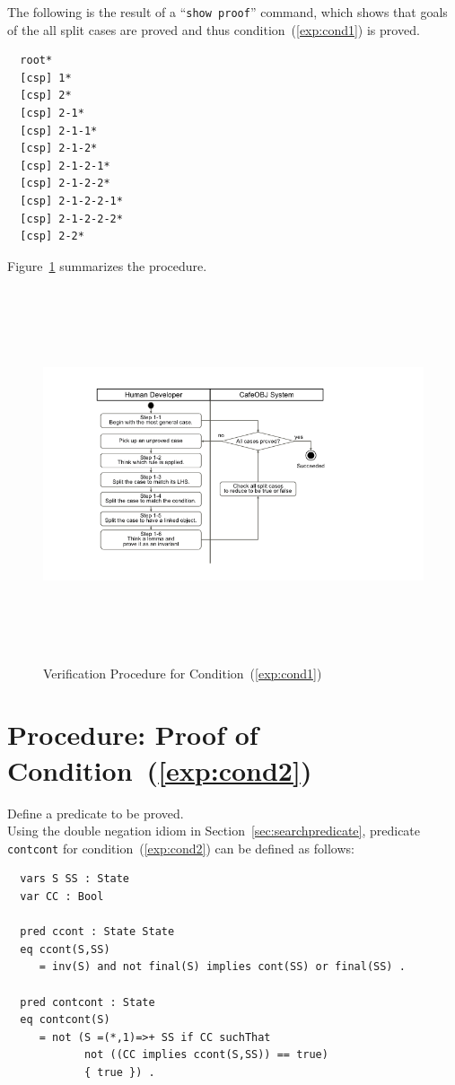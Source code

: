 \documentclass[12pt]{report}
\newcommand{\stt}[1]{{\small{\tt {#1}}}}
\begin{document}
The following is the result of a ``\stt{show proof}'' command, which shows
that goals of the all split cases are proved and thus
condition~(\ref{exp:cond1}) is proved.
\small
\begin{verbatim}
  root*
  [csp] 1*
  [csp] 2*
  [csp] 2-1*
  [csp] 2-1-1*
  [csp] 2-1-2*
  [csp] 2-1-2-1*
  [csp] 2-1-2-2*
  [csp] 2-1-2-2-1*
  [csp] 2-1-2-2-2*
  [csp] 2-2*
\end{verbatim}
\normalsize

Figure~\ref{fig:procedure1} summarizes the procedure.
\begin{figure}
\centering
\includegraphics[height=11cm,natwidth=720,natheight=405,clip,trim=100 55 190 40]{procedure1.png}
\caption{Verification Procedure for Condition~(\ref{exp:cond1})}
\label{fig:procedure1}
\end{figure}

\section{Procedure: Proof of Condition~(\ref{exp:cond2})}
\label{sec:contcont}
 Define a predicate to be proved. \\ Using the
double negation idiom in Section~\ref{sec:searchpredicate}, predicate
{\tt contcont} for condition~(\ref{exp:cond2}) can be defined as follows:
\small
\begin{verbatim}
  vars S SS : State
  var CC : Bool

  pred ccont : State State
  eq ccont(S,SS)
     = inv(S) and not final(S) implies cont(SS) or final(SS) .

  pred contcont : State
  eq contcont(S)
     = not (S =(*,1)=>+ SS if CC suchThat
            not ((CC implies ccont(S,SS)) == true)
            { true }) .
\end{verbatim}
\normalsize
\end{document}
